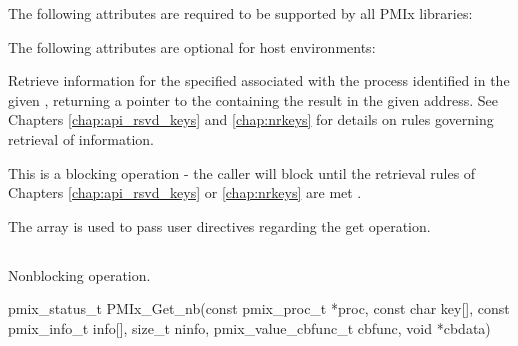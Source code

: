 \reqattrstart
The following attributes are required to be supported by all \ac{PMIx} libraries:


\reqattrend

\optattrstart
The following attributes are optional for host environments:


\optattrend

\descr

Retrieve information for the specified  associated with the process identified in the given , returning a pointer to the  containing the result in the given address. See Chapters \ref{chap:api_rsvd_keys} and \ref{chap:nrkeys} for details on rules governing retrieval of information.

This is a blocking operation - the caller will block until the retrieval rules of Chapters \ref{chap:api_rsvd_keys} or \ref{chap:nrkeys} are met .

The  array is used to pass user directives regarding the get operation.

\subsection{}

\summary

Nonblocking  operation.

\format

\cspecificstart
\begin{codepar}
pmix_status_t
PMIx_Get_nb(const pmix_proc_t *proc, const char key[],
            const pmix_info_t info[], size_t ninfo,
            pmix_value_cbfunc_t cbfunc, void *cbdata)
\end{codepar}
\cspecificend

\begin{arglist}
\end{arglist}

